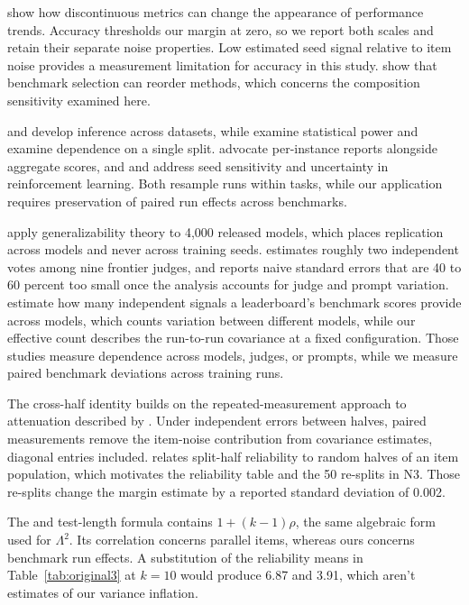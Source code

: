 \citet{schaeffer2023} show how discontinuous metrics can change the appearance of performance trends. Accuracy thresholds our margin at zero, so we report both scales and retain their separate noise properties. Low estimated seed signal relative to item noise provides a measurement limitation for accuracy in this study. \citet{dehghani2021} show that benchmark selection can reorder methods, which concerns the composition sensitivity examined here.

\citet{demsar2006} and \citet{dror2017} develop inference across datasets, while \citet{card2020} examine statistical power and \citet{gorman2019} examine dependence on a single split. \citet{burnell2023} advocate per-instance reports alongside aggregate scores, and \citet{henderson2018} and \citet{agarwal2021} address seed sensitivity and uncertainty in reinforcement learning. Both resample runs within tasks, while our application requires preservation of paired run effects across benchmarks.

\citet{hardy2026} apply generalizability theory to 4,000 released models, which places replication across models and never across training seeds. \citet{kohli2026} estimates roughly two independent votes among nine frontier judges, and \citet{messing2026} reports naive standard errors that are 40 to 60 percent too small once the analysis accounts for judge and prompt variation. \citet{sha2026} estimate how many independent signals a leaderboard's benchmark scores provide across models, which counts variation between different models, while our effective count describes the run-to-run covariance at a fixed configuration. Those studies measure dependence across models, judges, or prompts, while we measure paired benchmark deviations across training runs.

The cross-half identity builds on the repeated-measurement approach to attenuation described by \citet{spearman1904}. Under independent errors between halves, paired measurements remove the item-noise contribution from covariance estimates, diagonal entries included. \citet{cronbach1951} relates split-half reliability to random halves of an item population, which motivates the reliability table and the 50 re-splits in N3. Those re-splits change the margin estimate by a reported standard deviation of 0.002.

The \citet{brown1910} and \citet{spearman1910} test-length formula contains $1+(k-1)\rho$, the same algebraic form used for $\Lambda^2$. Its correlation concerns parallel items, whereas ours concerns benchmark run effects. A substitution of the reliability means in Table~\ref{tab:original3} at $k=10$ would produce 6.87 and 3.91, which aren't estimates of our variance inflation.

